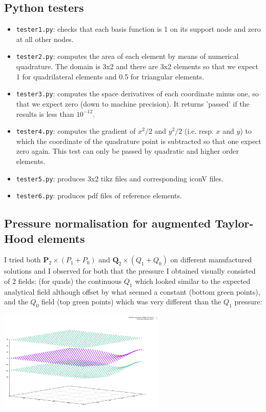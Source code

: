 \newpage
\subsection*{Python testers}

\begin{itemize}
\item \lstinline{tester1.py}: checks that each basis function is 1 on its support node and zero at all other nodes.
\item \lstinline{tester2.py}: computes the area of each element by means of numerical quadrature. The domain is 3x2 and there are 3x2 elements so that we expect 1 for quadrilateral elements and 0.5 for triangular elements.  
\item \lstinline{tester3.py}: computes the space derivatives of each coordinate minus one, so that we expect zero (down to machine precision). It returns 'passed' if the results is less than $10^{-12}$.   
\item \lstinline{tester4.py}: computes the gradient of $x^2/2$ and $y^2/2$ (i.e. resp. $x$ and $y$) to which the coordinate of the quadrature point is subtracted so that one expect zero again. This test can only be passed by quadratic and higher order elements.
\item \lstinline{tester5.py}: produces 3x2 tikz files and corresponding iconV files. 
\item \lstinline{tester6.py}: produces pdf files of reference elements.
\end{itemize}


\newpage
\subsection*{Pressure normalisation for augmented Taylor-Hood elements}


I tried both ${\bm P}_2\times (P_1+P_0)$ and ${\bm Q}_2\times (Q_1+Q_0)$ on different manufactured solutions 
and I observed for both that the pressure I obtained visually consisted of 2 fields: (for quads) 
the continuous $Q_1$ which looked similar to the expected analytical field although offset by what 
seemed a constant (bottom green points), and the $Q_0$ field (top green points) which was 
very different than the $Q_1$ pressure:

\begin{center}
\includegraphics[width=8cm]{python_codes/fieldstone_120/images/q2q1q0pb}
\end{center}

